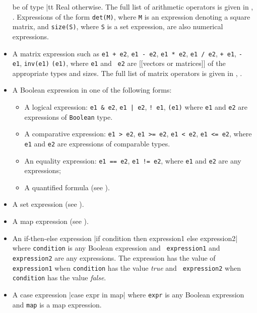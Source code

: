 \documentclass[12pt]{article}
\begin{document}
\begin{itemize}
  be of type {|tt Real} otherwise. The full list of arithmetic
  operators is given in , .
  Expressions of the form {\tt det(M)}, where {\tt M} is an expression
  denoting a square matrix, and {\tt size(S)}, where {\tt S} is a set
  expression, are also numerical expressions.
\item A matrix expression such as \texttt{e1 + e2}, \texttt{e1 - e2},
  \texttt{e1 * e2}, \texttt{e1 / e2},  \texttt{+ e1},
  \texttt{- e1}, {\tt inv(e1)} \texttt{(e1)}, where {\tt e1} and {\tt
    e2} are [[vectors or matrices]] of the appropriate types and
  sizes. The full list of matrix
  operators is given in ,
  .
\item A Boolean expression in one of the following forms:
\begin{itemize}
\item A logical expression: \texttt{e1 \& e2}, \texttt{e1 | e2}, \texttt{! e1}, \texttt{(e1)} where 
\texttt{e1} and \texttt{e2} are expressions of {\tt Boolean} type.
\item A comparative expression: \texttt{e1 > e2}, \texttt{e1 >= e2}, \texttt{e1 < e2}, \texttt{e1 <= e2}, where \texttt{e1} and \texttt{e2} are expressions of comparable types.
\item An equality expression: \texttt{e1 == e2}, \texttt{e1 != e2}, where \texttt{e1} and \texttt{e2} are any expressions;
\item A quantified formula (see ).
\end{itemize}
\item A set expression (see ).
\item A map expression (see ).
\item An if-then-else expression
     \blog|if condition then expression1 else expression2|
     where {\tt condition} is any Boolean expression and {\tt
       expression1} and {\tt expression2} are any expressions.
     The expression has the value of {\tt
       expression1} when {\tt condition} has the value {\it true}
     and {\tt
       expression2} when {\tt condition} has the value {\it false}.
\item A case expression
    \blog|case expr in map|
     where {\tt expr} is any Boolean expression and {\tt map} is a map
     expression.
\end{itemize}
\end{document}
